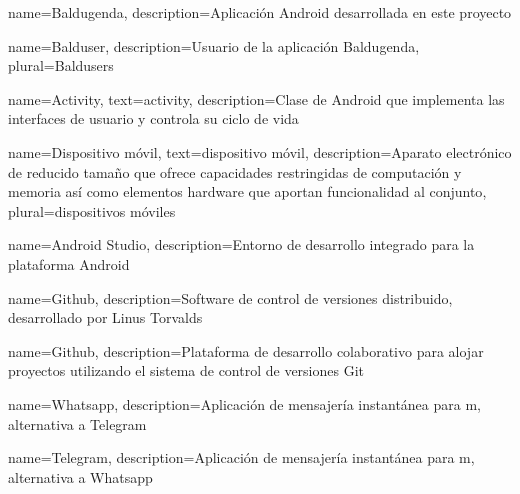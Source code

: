 {
    name=Baldugenda,
    description={Aplicaci\'on Android desarrollada en este proyecto}
}

{
    name=Balduser,
    description={Usuario de la aplicaci\'on Baldugenda},
    plural={Baldusers}
}

{
    name=Activity,
    text={activity},
    description={Clase de Android que implementa las interfaces de usuario y controla su ciclo de vida}
}

{
    name=Dispositivo móvil,
    text={dispositivo móvil},
    description={Aparato electrónico de reducido tamaño que ofrece capacidades restringidas de computación y memoria así como elementos hardware que aportan funcionalidad al conjunto},
    plural={dispositivos móviles}
}

{
    name=Android Studio,
    description={Entorno de desarrollo integrado para la plataforma Android}
}

{
    name=Github,
    description={Software de control de versiones distribuido, desarrollado por Linus Torvalds}
}

{
    name=Github,
    description={Plataforma de desarrollo colaborativo para alojar proyectos utilizando el sistema de control de versiones Git}
}

{
    name=Whatsapp,
    description={Aplicaci\'on de mensajería instant\'anea para m, alternativa a Telegram}
}

{
    name=Telegram,
    description={Aplicaci\'on de mensajería instant\'anea para m, alternativa a Whatsapp}
}









